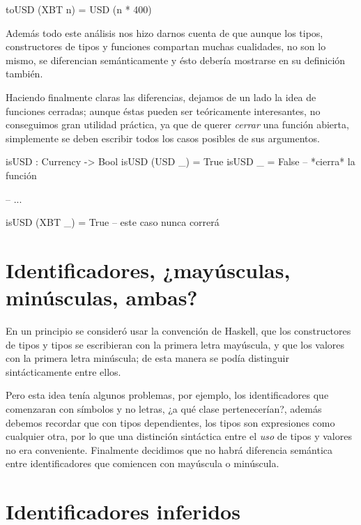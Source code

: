 {\begin{designfr}
\begin{anglercode}
toUSD (XBT n) = USD (n * 400)
\end{anglercode}

Además todo este análisis nos hizo darnos cuenta de que aunque los tipos, constructores de tipos y funciones compartan muchas cualidades, no son lo mismo, se diferencian semánticamente y ésto debería mostrarse en su definición también.

Haciendo finalmente claras las diferencias, dejamos de un lado la idea de funciones cerradas; aunque éstas pueden ser teóricamente interesantes, no conseguimos gran utilidad práctica, ya que de querer \textit{cerrar} una función abierta, simplemente se deben escribir todos los casos posibles de sus argumentos.

\begin{anglercode}
isUSD : Currency -> Bool
isUSD (USD _) = True
isUSD _ = False         -- *cierra* la función

-- ...

isUSD (XBT _) = True    -- este caso nunca correrá
\end{anglercode}
\end{designfr}

\section{Identificadores, ¿mayúsculas, minúsculas, ambas?}

\begin{designfr}
En un principio se consideró usar la convención de Haskell, que los constructores de tipos y tipos se escribieran con la primera letra mayúscula, y que los valores con la primera letra minúscula; de esta manera se podía distinguir sintácticamente entre ellos.

Pero esta idea tenía algunos problemas, por ejemplo, los identificadores que comenzaran con símbolos y no letras, ¿a qué clase pertenecerían?, además debemos recordar que con tipos dependientes, los tipos son expresiones como cualquier otra, por lo que una distinción sintáctica entre el \emph{uso} de tipos y valores no era conveniente. Finalmente decidimos que no habrá diferencia semántica entre identificadores que comiencen con mayúscula o minúscula.
\end{designfr}

\section{Identificadores inferidos}

}
